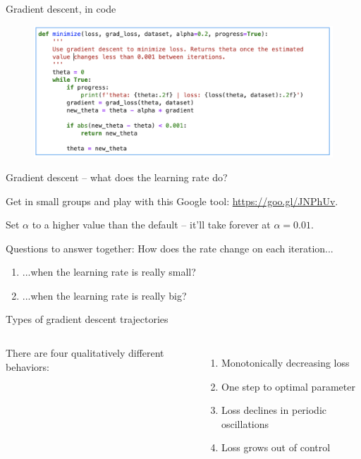 \documentclass[aspectratio=169, handout]{beamer}
\begin{document}
\begin{frame}{Gradient descent, in code}

%
%
%

\begin{figure}
\includegraphics[width=1.\textwidth]{grad_desc}
\end{figure}

\end{frame}

\begin{frame}{Gradient descent -- what does the learning rate do?}

Get in small groups and play with this Google tool: \href{https://goo.gl/JNPhUv}{https://goo.gl/JNPhUv}.

\vspace{5mm}

Set $\alpha$ to a higher value than the default -- it'll take forever at $\alpha = 0.01$.  
\vspace{5mm}

Questions to answer together:  How does the rate change on each iteration...
\begin{enumerate}
\item ...when the learning rate is really small?
\item ...when the learning rate is really big?
\end{enumerate}

\end{frame}

\begin{frame}{Types of gradient descent trajectories}

\begin{columns}
There are four qualitatively different behaviors:
\begin{enumerate}
\item Monotonically decreasing loss
\item One step to optimal parameter
\item Loss declines in periodic oscillations
\item Loss grows out of control
\end{enumerate}


\end{columns}

\end{frame}
\end{document}
